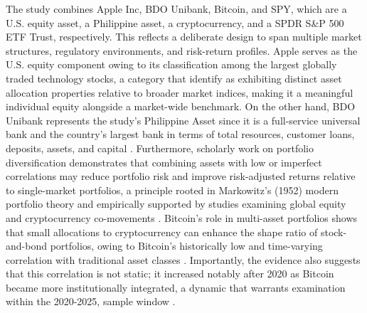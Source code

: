 The study combines Apple Inc, BDO Unibank, Bitcoin, and SPY, which are a U.S. equity asset, a Philippine asset, a cryptocurrency, and a SPDR S\&P 500 ETF Trust, respectively. This reflects a deliberate design to span multiple market structures, regulatory environments, and risk-return profiles. Apple serves as the U.S. equity component owing to its classification among the largest globally traded technology stocks, a category that \parencite{mirallesquiros2024bigtech} identify as exhibiting distinct asset allocation properties relative to broader market indices, making it a meaningful individual equity alongside a market-wide benchmark. On the other hand, BDO Unibank represents the study's Philippine Asset since it is a full-service universal bank and the country's largest bank in terms of total resources, customer loans, deposits, assets, and capital \parencite{bdounibank2025profile}. Furthermore, scholarly work on portfolio diversification demonstrates that combining assets with low or imperfect correlations may reduce portfolio risk and improve risk-adjusted returns relative to single-market portfolios, a principle rooted in Markowitz's (1952) modern portfolio theory and empirically supported by studies examining global equity and cryptocurrency co-movements \parencite{rizvi2018tripartite}. Bitcoin's role in multi-asset portfolios shows that small allocations to cryptocurrency can enhance the shape ratio of stock-and-bond portfolios, owing to Bitcoin's historically low and time-varying correlation with traditional asset classes \parencite{kajtazi2019bitcoin}. Importantly, the evidence also suggests that this correlation is not static; it increased notably after 2020 as Bitcoin became more institutionally integrated, a dynamic that warrants examination within the 2020-2025, sample window \parencite{jayawardhana2024cryptocurrency}.

